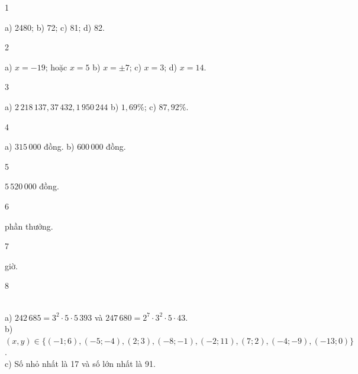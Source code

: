 \begin{Solbook}{1}
 \par \noindent a) 2480; \hspace {2cm} b) 72; \hspace {2cm} c) 81; \hspace {2cm} d) 82. \hfill \qedEX 
\end{Solbook}
\begin{Solbook}{2}
 \par \noindent a) $x=-19$; hoặc $x=5$ \hspace {1cm} b) $x=\pm 7$; \hspace {1.5cm} c) $x=3$; \hspace {1.5cm} d) $x=14$. \hfill \qedEX 
\end{Solbook}
\begin{Solbook}{3}
 \par \noindent a) $2\,218\,137, 37\,432, 1\,950\,244$ \hspace {2cm} b) $1,69\%$; \hspace {2cm} c) $87,92\%$. \hfill \qedEX 
\end{Solbook}
\begin{Solbook}{4}
 \par \noindent a) $315\,000$ đồng. \hspace {2cm} b) $600\,000$ đồng. \hfill \qedEX 
\end{Solbook}
\begin{Solbook}{5}
 \par \noindent $5\,520\,000$ đồng. \hfill \qedEX 
\end{Solbook}
\begin{Solbook}{6}
 \par {} phần thưởng. \hfill \qedEX 
\end{Solbook}
\begin{Solbook}{7}
 \par {} giờ. \hfill \qedEX 
\end{Solbook}
\begin{Solbook}{8}
 \par \noindent \\a) $242\,685=3^2\cdot 5\cdot 5\,393$ và $247\,680=2^7\cdot 3^2\cdot 5\cdot 43$.\\ b) $(x,y)\in \{(-1;6),(-5;-4),(2;3),(-8;-1),(-2;11),(7;2),(-4;-9),(-13;0)\}$.\\ c) Số nhỏ nhất là 17 và số lớn nhất là 91. \hfill \qedEX 
\end{Solbook}
